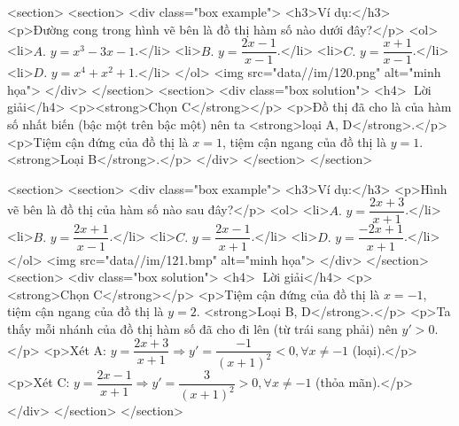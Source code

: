     <section>
        <section>
            <div class="box example">
                <h3>Ví dụ:</h3>
                <p>Đường cong trong hình vẽ bên là đồ thị hàm số nào dưới đây?</p>
                <ol>
                    <li>\(A.\) \(y = x^3 - 3x - 1\).</li>
                    <li>\(B.\) \(y = \dfrac{2x-1}{x-1}\).</li>
                    <li>\(C.\) \(y = \dfrac{x+1}{x-1}\).</li>
                    <li>\(D.\) \(y = x^4 + x^2 + 1\).</li>
                </ol>
                <img src="data//im/120.png" alt="minh họa">
            </div>
        </section>
        <section>
            <div class="box solution">
                <h4>📝 Lời giải</h4>
                <p><strong>Chọn C</strong></p>
                <p>Đồ thị đã cho là của hàm số nhất biến (bậc một trên bậc một) nên ta <strong>loại A, D</strong>.</p>
                <p>Tiệm cận đứng của đồ thị là \(x=1\), tiệm cận ngang của đồ thị là \(y=1\). <strong>Loại B</strong>.</p>
            </div>
        </section>
    </section>

    <section>
        <section>
            <div class="box example">
                <h3>Ví dụ:</h3>
                <p>Hình vẽ bên là đồ thị của hàm số nào sau đây?</p>
                <ol>
                    <li>\(A.\) \(y = \dfrac{2x+3}{x+1}\).</li>
                    <li>\(B.\) \(y = \dfrac{2x+1}{x-1}\).</li>
                    <li>\(C.\) \(y = \dfrac{2x-1}{x+1}\).</li>
                    <li>\(D.\) \(y = \dfrac{-2x+1}{x+1}\).</li>
                </ol>
                <img src="data//im/121.bmp" alt="minh họa">
            </div>
        </section>
        <section>
            <div class="box solution">
                <h4>📝 Lời giải</h4>
                <p><strong>Chọn C</strong></p>
                <p>Tiệm cận đứng của đồ thị là \(x = -1\), tiệm cận ngang của đồ thị là \(y=2\). <strong>Loại B, D</strong>.</p>
                <p>Ta thấy mỗi nhánh của đồ thị hàm số đã cho đi lên (từ trái sang phải) nên \(y' > 0\).</p>
                <p>Xét A: \(y = \dfrac{2x+3}{x+1} \Rightarrow y' = \dfrac{-1}{(x+1)^2} < 0, \forall x \ne -1\) (loại).</p>
                <p>Xét C: \(y = \dfrac{2x-1}{x+1} \Rightarrow y' = \dfrac{3}{(x+1)^2} > 0, \forall x \ne -1\) (thỏa mãn).</p>
            </div>
        </section>
    </section>

